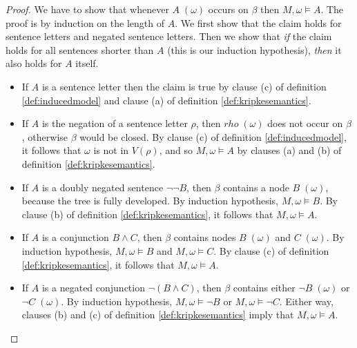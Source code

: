 \begin{proof}
  We have to show that whenever $A\; (\omega)$ occurs on $\beta$ then
  $M,\omega \models A$. The proof is by induction on the length of $A$. We first
  show that the claim holds for sentence letters and negated sentence letters.
  Then we show that \emph{if} the claim holds for all sentences shorter than $A$
  (this is our induction hypothesis), \emph{then} it also holds for $A$ itself.
  
  \begin{itemize}
    
    \item If $A$ is a sentence letter then the claim is true by clause (c) of
          definition \ref{def:inducedmodel} and clause (a) of definition
          \ref{def:kripkesemantics}.

    \item If $A$ is the negation of a sentence letter $\rho$, then $rho\; (\omega)$
          does not occur on $\beta$, otherwise $\beta$ would be closed. By
          clause (c) of definition \ref{def:inducedmodel}, it follows that
          $\omega$ is not in $V(\rho)$, and so $M, \omega \models A$ by clauses (a)
          and (b) of definition \ref{def:kripkesemantics}.
          
    \item If $A$ is a doubly negated sentence $\neg\neg B$, then $\beta$
          contains a node $B \;(\omega)$, because the tree is fully developed.
          By induction hypothesis, $M,\omega \models B$. By clause (b) of
          definition \ref{def:kripkesemantics}, it follows that
          $M,\omega \models A$.
    
    \item If $A$ is a conjunction $B\land C$, then $\beta$ contains nodes
          $B \;(\omega)$ and $C \;(\omega)$. By induction hypothesis,
          $M,\omega \models B$ and $M,\omega \models C$. By clause (c) of
          definition \ref{def:kripkesemantics}, it follows that
          $M,\omega \models A$.

    \item If $A$ is a negated conjunction $\neg(B\land C)$, then $\beta$ contains
          either $\neg B \;(\omega)$ or $\neg C \;(\omega)$. By induction
          hypothesis, $M,\omega \models \neg B$ or $M,\omega \models \neg C$.
          Either way, clauses (b) and (c) of definition
          \ref{def:kripkesemantics} imply that $M,\omega \models A$.
    
    

\end{itemize}
\end{proof}
